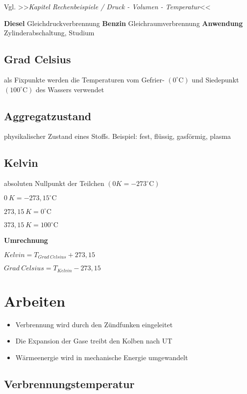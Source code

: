 Vgl. >>\emph{Kapitel Rechenbeispiele / Druck - Volumen - Temperatur}<<

\textbf{Diesel} Gleichdruckverbrennung \textbf{Benzin}
Gleichraumverbrennung \textbf{Anwendung} Zylinderabschaltung, Studium

\subsection{Grad Celsius}\label{grad-celsius}

als Fixpunkte werden die Temperaturen vom Gefrier- $(0^\circ\text{C})$
und Siedepunkt $(100^\circ\text{C})$ des Wassers verwendet

\subsection{Aggregatzustand}\label{aggregatzustand}

physikalischer Zustand eines Stoffs. Beispiel: fest, flüssig, gasförmig,
plasma

\subsection{Kelvin}\label{kelvin}

absoluten Nullpunkt der Teilchen $(0K = -273^\circ\text{C})$

$0~K = -273,15^\circ\text{C}$

$273,15~K = 0^\circ\text{C}$

$373,15~K = 100^\circ\text{C}$

\textbf{Umrechnung}

$Kelvin = T_{Grad~Celsius} + 273,15$

$Grad~Celsius = T_{Kelvin} - 273,15$

\section{Arbeiten}\label{arbeiten}

\begin{itemize}
\item
  Verbrennung wird durch den Zündfunken eingeleitet
\item
  Die Expansion der Gase treibt den Kolben nach UT
\item
  Wärmeenergie wird in mechanische Energie umgewandelt
\end{itemize}

\subsection{Verbrennungstemperatur}\label{verbrennungstemperatur}

